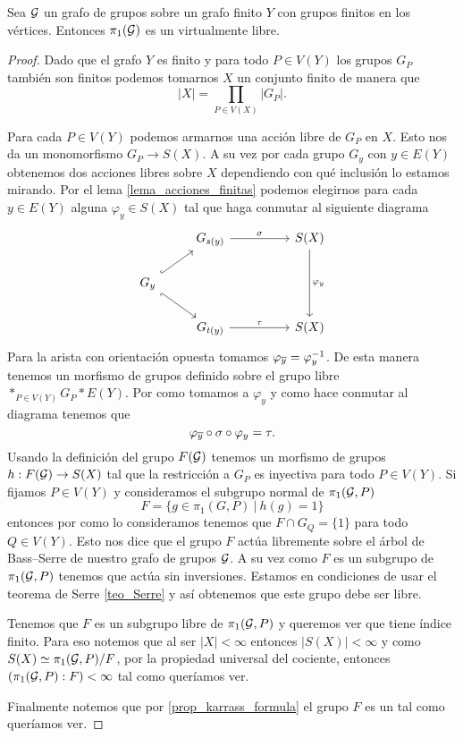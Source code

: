 \documentclass[tesis.tex]{subfiles}
\begin{document}
\begin{teo}\cite{karrass1973finite}
	Sea $\cal G$ un grafo de grupos sobre un grafo finito $Y$ con grupos finitos en los vértices.
	Entonces $\pi_1(\cal G)$ es un \fg virtualmente libre.
\end{teo}
\begin{proof}
	Dado que el grafo $Y$ es finito y para todo $P \in V(Y)$ los grupos $G_P$ también son finitos podemos tomarnos $X$ un conjunto finito de manera que
	\[
		|X| = \prod_{P \in V(X)} |G_P|.
	\] 
	
	Para cada $P \in V(Y)$ podemos armarnos una acción libre de $G_P$ en $X$. 
	Esto nos da un monomorfismo $G_P \to S(X)$.
	A su vez por cada grupo $G_y$ con $y \in E(Y)$ obtenemos dos acciones libres sobre $X$ dependiendo con qué inclusión lo estamos mirando.
	Por el lema \ref{lema_acciones_finitas} podemos elegirnos para cada $y \in E(Y)$ alguna $\varphi_y \in S(X)$ tal que haga conmutar al siguiente diagrama
	\[\begin{tikzcd}
		& {G_{s(y)}} && {S(X)} \\
		{G_y} \\
		& {G_{t(y)}} && {S(X)}
		\arrow["\sigma", from=1-2, to=1-4]
		\arrow["\tau", from=3-2, to=3-4]
		\arrow[hook, from=2-1, to=1-2]
		\arrow[hook', from=2-1, to=3-2]
		\arrow["\varphi_y", from=1-4, to=3-4]
	\end{tikzcd}\]
	Para la arista con orientación opuesta tomamos $\varphi_{\overline y} = \varphi_y^{-1}$.
	De esta manera tenemos un morfismo de grupos definido sobre el grupo libre $\ast_{P \in V(Y)} G_P \ast E(Y)$.
	Por como tomamos a $\varphi_y$ y como hace conmutar al diagrama tenemos que 
	\[
	\varphi_{\overline y} \circ \sigma \circ \varphi_y = \tau.
	\]	
	Usando la definición del grupo $F({\cal G})$ tenemos un morfismo de grupos $h: F({\cal G}) \to S(X)$ tal que la restricción a $G_P$ es inyectiva para todo $P \in V(Y)$.
	Si fijamos $P \in V(Y)$ y consideramos el subgrupo normal de $\pi_1({\cal G}, P)$ 
	\[
	F = \{  g \in \pi_1(G,P) \ | \ h(g) = 1  \}
	\]
	entonces por como lo consideramos tenemos que $F \cap G_Q = \{ 1 \}$ para todo $Q \in V(Y)$.
	Esto nos dice que el grupo $F$ actúa libremente sobre el árbol de Bass--Serre de nuestro grafo de grupos ${\cal G}$.
	A su vez como $F$ es un subgrupo de $\pi_1 ({\cal G}, P)$ tenemos que actúa sin inversiones.
	Estamos en condiciones de usar el teorema de Serre \ref{teo_Serre} y así obtenemos que este grupo debe ser libre. 
	
	Tenemos que $F$ es un subgrupo libre de $\pi_1({\cal G}, P)$ y queremos ver que tiene índice finito.
	Para eso notemos que al ser $|X| < \infty$ entonces $|S(X)| < \infty$ y como $S(X) \simeq \pi_1({\cal G}, P) / F$, por la propiedad universal del cociente, entonces $(\pi_1({\cal G}, P) : F) < \infty$ tal como queríamos ver.
	
	Finalmente notemos que por \ref{prop_karrass_formula} el grupo $F$ es un \fg tal como queríamos ver.
\end{proof}
\end{document}
